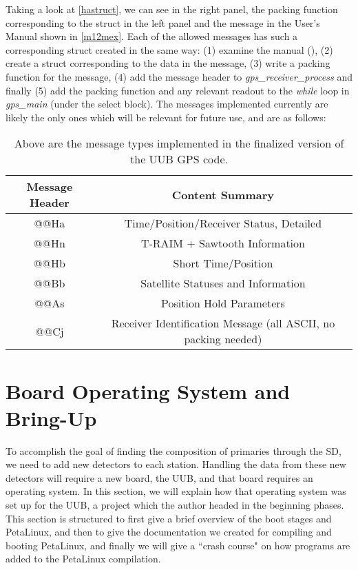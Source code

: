 Taking a look at \autoref{hastruct}, we can see in the right panel, the packing function corresponding to the struct in the left panel and the message in the User's Manual shown in \autoref{m12mex}. Each of the allowed messages has such a corresponding struct created in the same way: (1) examine the manual (\textcite{m12muser}), (2) create a struct corresponding to the data in the message, (3) write a packing function for the message, (4) add the message header to \textit{gps\_receiver\_process} and finally (5) add the packing function and any relevant readout to the \textit{while} loop in \textit{gps\_main} (under the select block). The messages implemented currently are likely the only ones which will be relevant for future use, and are as follows:

\begin{table}[h!]
\centering
\begin{tabular}{|c|c|} \hline
Message Header & Content Summary  \\ \hline
@@Ha & Time/Position/Receiver Status, Detailed  \\ \hline
@@Hn & T-RAIM + Sawtooth Information  \\ \hline
@@Hb & Short Time/Position  \\ \hline
@@Bb & Satellite Statuses and Information   \\ \hline
@@As & Position Hold Parameters   \\ \hline
@@Cj & Receiver Identification Message (all ASCII, no packing needed)  \\ \hline
\end{tabular}
\caption[GPS Message Type]{Above are the message types implemented in the finalized version of the UUB GPS code.}
\label{messtab}
\end{table}

\section{Board Operating System and Bring-Up}
\label{bringup}
To accomplish the goal of finding the composition of primaries through the SD, we need to add new detectors to each station. Handling the data from these new detectors will require a new board, the UUB, and that board requires an operating system. In this section, we will explain how that operating system was set up for the UUB, a project which the author headed in the beginning phases. This section is structured to first give a brief overview of the boot stages and PetaLinux, and then to give the documentation we created for compiling and booting PetaLinux, and finally we will give a ``crash course" on how programs are added to the PetaLinux compilation.

